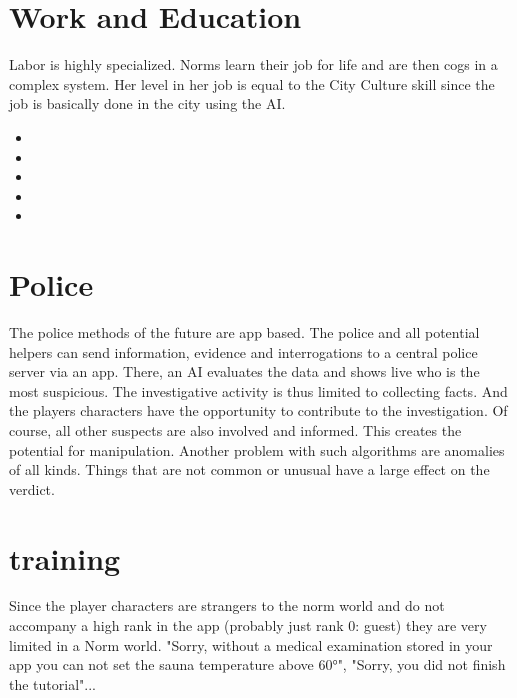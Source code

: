 \section{Work and Education}
Labor is highly specialized. Norms learn their job for life and are then cogs in a complex system. Her level in her job is equal to the City Culture skill since the job is basically done in the city using the AI.
\begin{normtalk}[title=An example from the life of a Level 3 Architect.]
    \begin{itemize}
        \item {}
        \item {}
        \item {}
        \item {}
        \item {}
    \end{itemize}
\end{normtalk}

\section{Police}
The police methods of the future are app based. The police and all potential helpers can send information, evidence and interrogations to a central police server via an app. There, an AI evaluates the data and shows live who is the most suspicious. The investigative activity is thus limited to collecting facts. And the players characters have the opportunity to contribute to the investigation. Of course, all other suspects are also involved and informed. This creates the potential for manipulation. Another problem with such algorithms are anomalies of all kinds. Things that are not common or unusual have a large effect on the verdict.

\section{training}

Since the player characters are strangers to the norm world and do not accompany a high rank in the app (probably just rank 0: guest) they are very limited in a Norm world. "Sorry, without a medical examination stored in your app you can not set the sauna temperature above 60°", "Sorry, you did not finish the tutorial"...